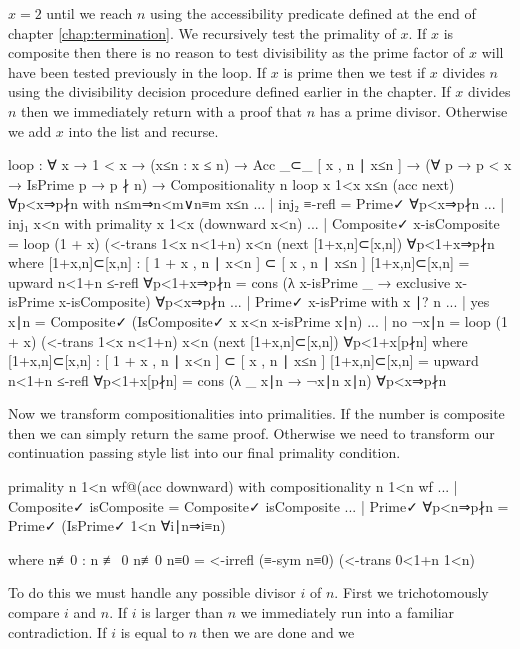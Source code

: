 \documentclass[./Thesis.tex]{subfiles}
\begin{document}
$x = 2$
until we reach $n$ using the accessibility predicate defined at the end of chapter
\ref{chap:termination}. We recursively test the primality of $x$. If $x$ is
composite then there is no reason to test divisibility as the prime factor of
$x$ will have been tested previously in the loop. If $x$ is prime then we test if
$x$ divides $n$ using the divisibility decision procedure defined earlier in the
chapter. If $x$ divides $n$ then we immediately return with a proof that $n$ has
a prime divisor. Otherwise we add $x$ into the list and recurse.
\begin{code}
    loop
      : ∀ x → 1 < x → (x≤n : x ≤ n) → Acc _⊂_ [ x , n ∣ x≤n ]
      → (∀ {p} → p < x → IsPrime p → p ∤ n)
      → Compositionality n
    loop x 1<x x≤n (acc next) ∀p<x⇒p∤n with n≤m⇒n<m∨n≡m x≤n
    ... | inj₂ ≡-refl = Prime✓ ∀p<x⇒p∤n
    ... | inj₁ x<n with primality x 1<x (downward x<n)
    ...   | Composite✓ x-isComposite
          = loop (1 + x) (<-trans 1<x n<1+n) x<n (next [1+x,n]⊂[x,n]) ∀p<1+x⇒p∤n
            where
            [1+x,n]⊂[x,n] : [ 1 + x , n ∣ x<n ] ⊂ [ x , n ∣ x≤n ]
            [1+x,n]⊂[x,n] = upward n<1+n ≤-refl
            ∀p<1+x⇒p∤n = cons (λ x-isPrime _ → exclusive x-isPrime x-isComposite) ∀p<x⇒p∤n
    ...   | Prime✓ x-isPrime with x ∣? n
    ...     | yes x∣n = Composite✓ (IsComposite✓ x x<n x-isPrime x∣n)
    ...     | no ¬x∣n = loop (1 + x) (<-trans 1<x n<1+n) x<n (next [1+x,n]⊂[x,n]) ∀p<1+x[p∤n]
            where
            [1+x,n]⊂[x,n] : [ 1 + x , n ∣ x<n ] ⊂ [ x , n ∣ x≤n ]
            [1+x,n]⊂[x,n] = upward n<1+n ≤-refl
            ∀p<1+x[p∤n] = cons (λ _ x∣n → ¬x∣n x∣n) ∀p<x⇒p∤n
\end{code}
Now we transform compositionalities into primalities. If the number is
composite then we can simply return the same proof. Otherwise we need to
transform our continuation passing style list into our final primality condition.
\begin{code}
  primality n 1<n wf@(acc downward) with compositionality n 1<n wf
  ... | Composite✓ isComposite = Composite✓ isComposite
  ... | Prime✓ ∀p<n⇒p∤n = Prime✓ (IsPrime✓ 1<n ∀i∣n⇒i≡n)
\end{code}
\begin{code}[hide]
    where
    n≢0 : n ≢ 0
    n≢0 n≡0 = <-irrefl (≡-sym n≡0) (<-trans 0<1+n 1<n)
\end{code}
To do this we must handle any possible divisor $i$ of $n$. First we
trichotomously compare $i$ and $n$. If $i$ is larger than $n$ we immediately run
into a familiar contradiction. If $i$ is equal to $n$ then we are done and we
\end{document}
